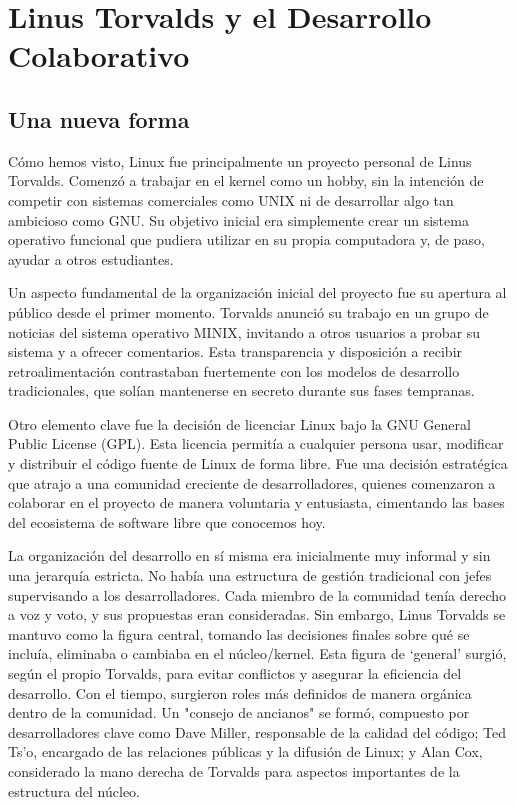 \documentclass[a4paper,12pt]{article}
\begin{document}
\section{Linus Torvalds y el Desarrollo Colaborativo}

\subsection{Una nueva forma}

Cómo hemos visto, Linux fue principalmente un proyecto personal de Linus Torvalds.
Comenzó a trabajar en el kernel como un hobby, sin la intención de competir con
sistemas comerciales como UNIX ni de desarrollar algo tan ambicioso como GNU. Su
objetivo inicial era simplemente crear un sistema operativo funcional que
pudiera utilizar en su propia computadora y, de paso, ayudar a otros
estudiantes.

Un aspecto fundamental de la organización inicial del proyecto fue su apertura
al público desde el primer momento. Torvalds anunció su trabajo en un grupo de
noticias del sistema operativo MINIX, invitando a otros usuarios a probar su
sistema y a ofrecer comentarios. Esta transparencia y disposición a recibir
retroalimentación contrastaban fuertemente con los modelos de desarrollo
tradicionales, que solían mantenerse en secreto durante sus fases tempranas.

Otro elemento clave fue la decisión de licenciar Linux bajo la GNU General
Public License (GPL). Esta licencia permitía a cualquier persona usar, modificar
y distribuir el código fuente de Linux de forma libre. Fue una decisión
estratégica que atrajo a una comunidad creciente de desarrolladores, quienes
comenzaron a colaborar en el proyecto de manera voluntaria y entusiasta,
cimentando las bases del ecosistema de software libre que conocemos hoy.

La organización del desarrollo en sí misma era inicialmente muy informal y sin
una jerarquía estricta. No había una estructura de gestión tradicional con jefes
supervisando a los desarrolladores. Cada miembro de la comunidad tenía derecho a
voz y voto, y sus propuestas eran consideradas. Sin embargo, Linus Torvalds se
mantuvo como la figura central, tomando las decisiones finales sobre qué se
incluía, eliminaba o cambiaba en el núcleo/kernel. Esta figura de `general'
surgió, según el propio Torvalds, para evitar conflictos y asegurar la
eficiencia del desarrollo.  Con el tiempo, surgieron roles más definidos de
manera orgánica dentro de la comunidad. Un "consejo de ancianos" se formó,
compuesto por desarrolladores clave como Dave Miller, responsable de la calidad
del código; Ted Ts'o, encargado de las relaciones públicas y la difusión de
Linux; y Alan Cox, considerado la mano derecha de Torvalds para aspectos
importantes de la estructura del núcleo.
\end{document}
